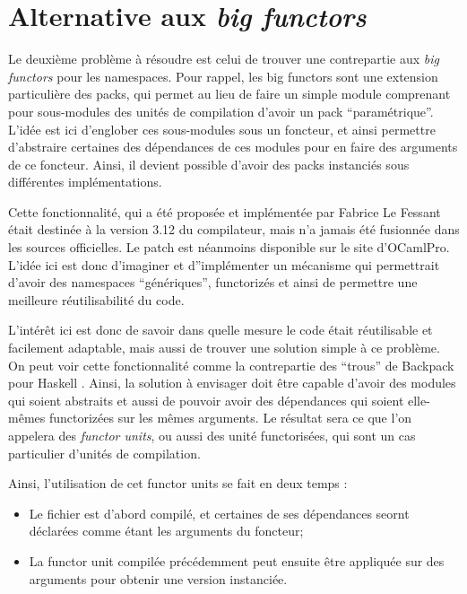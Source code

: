 \documentclass[11pt,a4paper]{report}
\begin{document}
\section{Alternative aux \emph{big functors}}

Le deuxième problème à résoudre est celui de trouver une contrepartie aux
\emph{big functors} pour les namespaces. Pour rappel, les big functors sont une
extension particulière des packs, qui permet au lieu de faire un simple module
comprenant pour sous-modules des unités de compilation d'avoir un pack
``paramétrique''. L'idée est ici d'englober ces sous-modules sous un foncteur, et
ainsi permettre d'abstraire certaines des dépendances de ces modules pour en
faire des arguments de ce foncteur. Ainsi, il devient possible d'avoir des packs
instanciés sous différentes implémentations.

Cette fonctionnalité, qui a été proposée et implémentée par Fabrice Le Fessant
\cite{lefessant-bigfunctors} était destinée à la version 3.12 du compilateur,
mais n'a jamais été fusionnée dans les sources officielles. Le patch est
néanmoins disponible sur le site d'OCamlPro. L'idée ici est donc d'imaginer et
d''implémenter un mécanisme qui permettrait d'avoir des namespaces
``génériques'', functorizés et ainsi de permettre une meilleure réutilisabilité
du code.

L'intérêt ici est donc de savoir dans quelle mesure le code était réutilisable
et facilement adaptable, mais aussi de trouver une solution simple à ce
problème. On peut voir cette fonctionnalité comme la contrepartie des ``trous''
de Backpack pour Haskell \cite{KilpatrickDJM14}. Ainsi, la solution à envisager
doit être capable d'avoir des modules qui soient abstraits et aussi de pouvoir
avoir des dépendances qui soient elle-mêmes functorizées sur les mêmes
arguments. Le résultat sera ce que l'on appelera des \emph{functor units}, ou
aussi des unité functorisées, qui sont un cas particulier d'unités de
compilation.

Ainsi, l'utilisation de cet functor units se fait en deux temps :
\begin{itemize}
\item Le fichier est d'abord compilé, et certaines de ses dépendances seornt
  déclarées comme étant les arguments du foncteur;
\item La functor unit compilée précédemment peut ensuite être appliquée sur des
  arguments pour obtenir une version instanciée.
\end{itemize}
\end{document}
